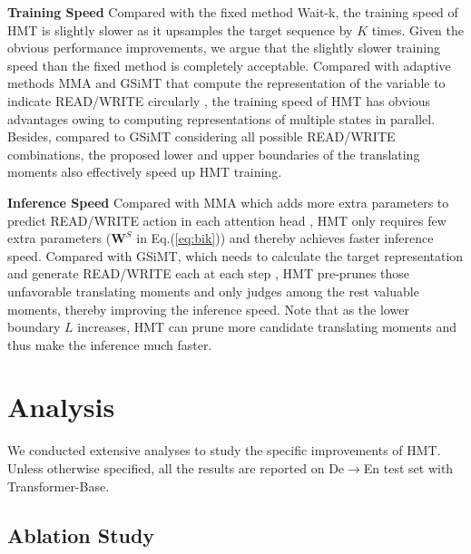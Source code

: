 \documentclass{article} %
\begin{document}
\textbf{Training Speed} Compared with the fixed method Wait-k, the training speed of HMT is slightly slower as it upsamples the target sequence by $K$ times. Given the obvious performance improvements, we argue that the slightly slower training speed than the fixed method is completely acceptable. Compared with adaptive methods MMA and GSiMT that compute the representation of the variable to indicate READ/WRITE circularly \citep{Ma2019a,miao-etal-2021-generative}, the training speed of HMT has obvious advantages owing to computing representations of multiple states in parallel. Besides, compared to GSiMT considering all possible READ/WRITE combinations, the proposed lower and upper boundaries of the translating moments also effectively speed up HMT training.

\textbf{Inference Speed} Compared with MMA which adds more extra parameters to predict \vspace{-0.5mm}READ/WRITE action in each attention head \citep{Ma2019a}, HMT only requires few extra parameters ($\textbf{W}^{S}$ in Eq.(\ref{eq:bik})) and thereby achieves faster inference speed. Compared with GSiMT, which needs to calculate the target representation and generate READ/WRITE each at each step \citep{miao-etal-2021-generative}, HMT pre-prunes those unfavorable translating moments and only judges among the rest valuable moments, thereby improving the inference speed. Note that as the lower boundary $L$ increases, HMT can prune more candidate translating moments and thus make the inference much faster.


\section{Analysis}
We conducted extensive analyses to study the specific improvements of HMT. Unless otherwise specified, all the results are reported on De$\rightarrow$En test set with Transformer-Base.

\subsection{Ablation Study}
\label{sec:ablation}
\end{document}
